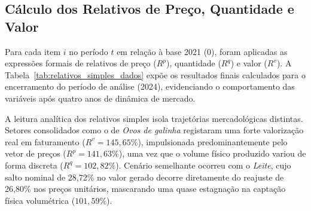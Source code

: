\documentclass[12pt,a4paper]{article}
\begin{document}
\subsection{Cálculo dos Relativos de Preço, Quantidade e Valor}

Para cada item $i$ no período $t$ em relação à base 2021 ($0$), foram aplicadas as expressões formais de relativos de preço ($R^p$), quantidade ($R^q$) e valor ($R^v$). A Tabela~\ref{tab:relativos_simples_dados} expõe os resultados finais calculados para o encerramento do período de análise (2024), evidenciando o comportamento das variáveis após quatro anos de dinâmica de mercado.

\begin{table}[H]
\centering
\caption{Relativos Simples de Preço, Quantidade e Valor para o Brasil (Ano-Base 2021 = 100).}
\label{tab:relativos_simples_dados}
\end{table}

A leitura analítica dos relativos simples isola trajetórias mercadológicas distintas. Setores consolidados como o de \textit{Ovos de galinha} registaram uma forte valorização real em faturamento ($R^v = 145,65\%$), impulsionada predominantemente pelo vetor de preços ($R^p = 141,63\%$), uma vez que o volume físico produzido variou de forma discreta ($R^q = 102,82\%$). Cenário semelhante ocorreu com o \textit{Leite}, cujo salto nominal de 28,72\% no valor gerado decorre diretamente do reajuste de 26,80\% nos preços unitários, mascarando uma quase estagnação na captação física volumétrica ($101,59\%$).
\end{document}
